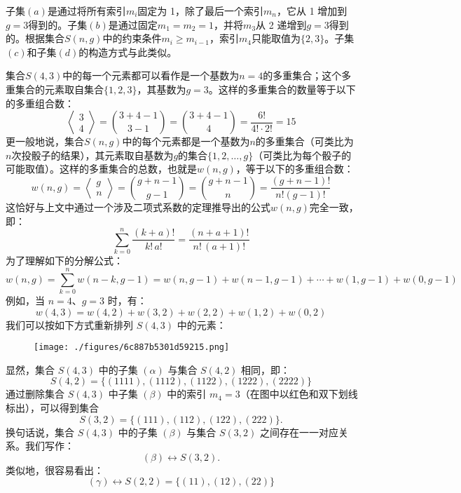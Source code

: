 子集\((a)\)是通过将所有索引\( m_i \)固定为 1，除了最后一个索引\( m_n\)，它从 1 增加到\( g = 3 \)得到的。子集\((b)\)是通过固定\( m_1 = m_2 = 1 \)，并将\( m_3 \)从 2 递增到\( g = 3 \)得到的。根据集合\( S(n, g) \)中的约束条件\( m_i \geq m_{i-1} \)，索引\( m_4 \)只能取值为\( \{2, 3\} \)。子集\((c)\)和子集\((d)\)的构造方式与此类似。

集合\( S(4, 3) \)中的每一个元素都可以看作是一个基数为\( n = 4 \)的多重集合；这个多重集合的元素取自集合\( \{1, 2, 3\} \)，其基数为\( g = 3 \)。这样的多重集合的数量等于以下的多重组合数：
\[
\left\langle \begin{matrix} 3 \\ 4 \end{matrix} \right\rangle = \binom{3 + 4 - 1}{3 - 1}=\binom{3 + 4 - 1}{4}= \frac{6!}{4! \cdot 2!} = 15~
\]
更一般地说，集合\( S(n, g) \)中的每个元素都是一个基数为\( n \)的多重集合（可类比为\( n \)次投骰子的结果），其元素取自基数为\( g \)的集合\( \{1, 2, \dots, g\} \)（可类比为每个骰子的可能取值）。这样的多重集合的总数，也就是\( w(n, g) \)，等于以下的多重组合数：
\[
w(n, g) = \left\langle \begin{matrix} g \\ n \end{matrix} \right\rangle = \binom{g + n - 1}{g - 1} = \binom{g + n - 1}{n} = \frac{(g + n - 1)!}{n! (g - 1)!}~
\]
这恰好与上文中通过一个涉及二项式系数的定理推导出的公式\(w(n, g)\)完全一致，即：
\[
\sum_{k=0}^{n} \frac{(k + a)!}{k! \, a!} = \frac{(n + a + 1)!}{n! \, (a + 1)!}~
\]
为了理解如下的分解公式：
\[
w(n, g) = \sum_{k = 0}^{n} w(n - k, g - 1) = w(n, g - 1) + w(n - 1, g - 1) + \cdots + w(1, g - 1) + w(0, g - 1)~
\]
例如，当 \( n = 4 \)、\( g = 3 \) 时，有：
\[
w(4, 3) = w(4, 2) + w(3, 2) + w(2, 2) + w(1, 2) + w(0, 2)~
\]
我们可以按如下方式重新排列 \( S(4, 3) \) 中的元素：
\begin{figure}[ht]
\centering
\texttt{[image: ./figures/6c887b5301d59215.png]}
\caption{} \label{fig_BSAYST_3}
\end{figure}
显然，集合 \( S(4, 3) \) 中的子集 \( (\alpha) \) 与集合 \( S(4, 2) \) 相同，即：
\[
S(4, 2) = \{ (1111), (1112), (1122), (1222), (2222) \}~
\]
通过删除集合 \( S(4, 3) \) 中子集 \( (\beta) \) 中的索引 \( m_4 = 3 \)（在图中以红色和双下划线标出），可以得到集合
\[
S(3, 2) = \{ (111), (112), (122), (222) \}.~
\]
换句话说，集合 \( S(4, 3) \) 中的子集 \( (\beta) \) 与集合 \( S(3, 2) \) 之间存在一一对应关系。我们写作：
\[
(\beta) \longleftrightarrow S(3, 2).~
\]
类似地，很容易看出：
\[
(\gamma) \longleftrightarrow S(2, 2) = \{ (11), (12), (22) \}~
\]
